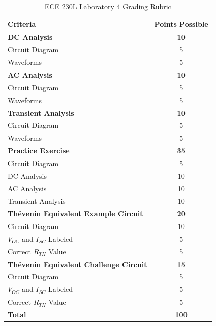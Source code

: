 \documentclass[12pt]{../manual}
\begin{document}
\begin{table}[ht!]
\caption{ECE 230L Laboratory 4 Grading Rubric}
\centering
\begin{tabular}{l|c} \hline
Criteria & Points Possible \\ \hline \hline
\textbf{DC Analysis}			& \textbf{10} \\
Circuit Diagram 				& 5 \\
Waveforms 						& 5 \\ \hline
\textbf{AC Analysis}			& \textbf{10} \\
Circuit Diagram 				& 5 \\
Waveforms 						& 5 \\ \hline
\textbf{Transient Analysis}		& \textbf{10} \\
Circuit Diagram 				& 5 \\ 
Waveforms 						& 5 \\ \hline
\textbf{Practice Exercise}		& \textbf{35} \\
Circuit Diagram 				& 5 \\
DC Analysis						& 10 \\
AC Analysis						& 10 \\
Transient Analysis				& 10 \\ \hline
\textbf{Th\'evenin Equivalent Example Circuit} & \textbf{20} \\
Circuit Diagram					& 10 \\
$V_{OC}$ and $I_{SC}$ Labeled	& 5 \\
Correct $R_{TH}$ Value			& 5 \\ \hline
\textbf{Th\'evenin Equivalent Challenge Circuit} & \textbf{15} \\
Circuit Diagram					& 5 \\
$V_{OC}$ and $I_{SC}$ Labeled	& 5 \\
Correct $R_{TH}$ Value			& 5 \\ \hline \hline
\textbf{Total}					& \textbf{100} \\ \hline
\end{tabular}
\end{table}
\vfill %
\end{document}
